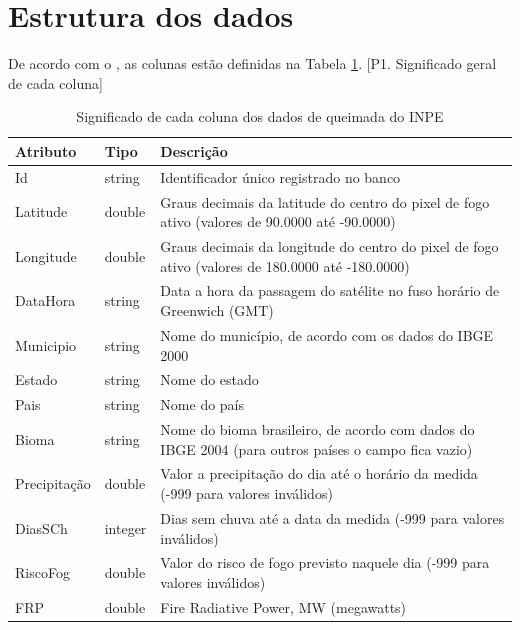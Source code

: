 \documentclass[cic,tc]{iiufrgs}
\begin{document}
\section{Estrutura dos dados}

De acordo com o \citep{PerguntasFrequentesINPE}, as colunas estão definidas
na Tabela \ref{table:inpeColumns}. [P1. Significado geral de cada coluna]

\begin{table}[h!]
\centering
\caption{Significado de cada coluna dos dados de queimada do INPE}
\begin{tabular}{ | l l p{10cm} | }
\hline
 Atributo & Tipo & Descrição \\
\hline
 Id & string & Identificador único registrado no banco \\
  \hline
 Latitude & double & Graus decimais da latitude do centro do pixel de 
                     fogo ativo (valores de 90.0000 até -90.0000) \\ 
  \hline
 Longitude & double & Graus decimais da longitude do centro do pixel de 
                      fogo ativo (valores de 180.0000 até -180.0000) \\  
  \hline
 DataHora & string & Data a hora da passagem do satélite no fuso 
                     horário de Greenwich (GMT) \\   
  \hline
 Municipio & string & Nome do município, de acordo com os dados do IBGE 2000 \\
  \hline
 Estado & string & Nome do estado \\
  \hline
 Pais & string & Nome do país \\  
  \hline
 Bioma & string & Nome do bioma brasileiro, de acordo com dados do IBGE 2004 
                  (para outros países o campo fica vazio) \\
  \hline
 Precipitação & double & Valor a precipitação do dia até o horário da medida
                         (-999 para valores inválidos) \\
  \hline
 DiasSCh & integer & Dias sem chuva até a data da medida 
                     (-999 para valores inválidos) \\
  \hline
  RiscoFog & double & Valor do risco de fogo previsto naquele dia 
                      (-999 para valores inválidos) \\
  \hline
  FRP & double & Fire Radiative Power, MW (megawatts) \\
 \hline
\end{tabular}
\label{table:inpeColumns}
\end{table}
\end{document}
